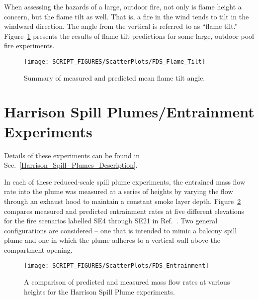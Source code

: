 When assessing the hazards of a large, outdoor fire, not only is flame height a concern, but the flame tilt as well. That is, a fire in the wind tends to tilt in the windward direction. The angle from the vertical is referred to as ``flame tilt.'' Figure~\ref{Flame_Tilt_Scatterplot} presents the results of flame tilt predictions for some large, outdoor pool fire experiments.

\begin{figure}[!h]
\begin{center}
\texttt{[image: SCRIPT\_FIGURES/ScatterPlots/FDS\_Flame\_Tilt]}
\end{center}
\caption[Summary of flame tilt angle predictions]
{Summary of measured and predicted mean flame tilt angle.}
\label{Flame_Tilt_Scatterplot}
\end{figure}



\clearpage

\section{Harrison Spill Plumes/Entrainment Experiments}
\label{Harrison_Spill_Plumes}
\label{Entrainment}

Details of these experiments can be found in Sec.~\ref{Harrison_Spill_Plumes_Description}.

In each of these reduced-scale spill plume experiments, the entrained mass flow rate into the plume was measured at a series of heights by varying the flow through an exhaust hood to maintain a constant smoke layer depth.  Figure~\ref{Entrainment_Plot} compares measured and predicted entrainment rates at five different elevations for the fire scenarios labelled SE4 through SE21 in Ref.~\cite{Harrison:2009}. Two general configurations are considered -- one that is intended to mimic a balcony spill plume and one in which the plume adheres to a vertical wall above the compartment opening.

\begin{figure}[h]
\begin{center}
\texttt{[image: SCRIPT\_FIGURES/ScatterPlots/FDS\_Entrainment]}
\caption[Summary of plume entrainment predictions]{A comparison of predicted and measured mass flow rates at various heights for the Harrison Spill Plume experiments.}
\label{Entrainment_Plot}
\end{center}
\end{figure}




